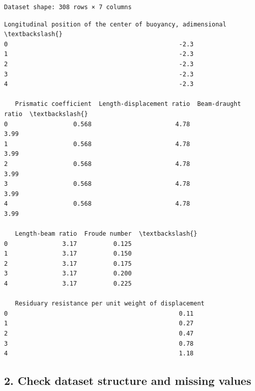 \documentclass[1pt]{article}
\begin{document}
    \begin{Verbatim}[commandchars=\\\{\}]
Dataset shape: 308 rows × 7 columns
    \end{Verbatim}


    \begin{Verbatim}[commandchars=\\\{\}]
   Longitudinal position of the center of buoyancy, adimensional  \textbackslash{}
0                                               -2.3               
1                                               -2.3               
2                                               -2.3               
3                                               -2.3               
4                                               -2.3               

   Prismatic coefficient  Length-displacement ratio  Beam-draught ratio  \textbackslash{}
0                  0.568                       4.78                3.99   
1                  0.568                       4.78                3.99   
2                  0.568                       4.78                3.99   
3                  0.568                       4.78                3.99   
4                  0.568                       4.78                3.99   

   Length-beam ratio  Froude number  \textbackslash{}
0               3.17          0.125   
1               3.17          0.150   
2               3.17          0.175   
3               3.17          0.200   
4               3.17          0.225   

   Residuary resistance per unit weight of displacement  
0                                               0.11     
1                                               0.27     
2                                               0.47     
3                                               0.78     
4                                               1.18
    \end{Verbatim}


    \hypertarget{check-dataset-structure-and-missing-values}{%
        \subsection{2. Check dataset structure and missing
        values}\label{check-dataset-structure-and-missing-values}}
\end{document}
